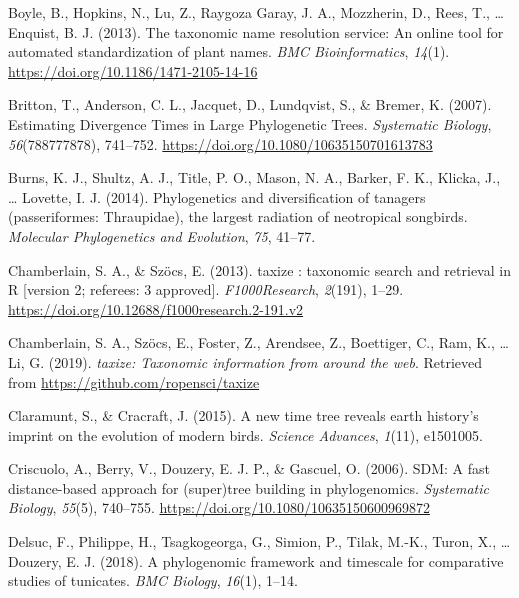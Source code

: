 \documentclass[
  english,
  man]{apa6}
\newlength{\cslhangindent}
\newlength{\cslentryspacingunit} %
\newenvironment{CSLReferences}[2] %
 {%
  \setlength{\parindent}{0pt}
  \ifodd #1
  \let\oldpar\par
  \def\par{\hangindent=\cslhangindent\oldpar}
  \fi
  \setlength{\parskip}{#2\cslentryspacingunit}
 }%
 {}
\begin{document}
\begin{CSLReferences}{1}{0}
\leavevmode{}%
Boyle, B., Hopkins, N., Lu, Z., Raygoza Garay, J. A., Mozzherin, D., Rees, T., \ldots{} Enquist, B. J. (2013). {The taxonomic name resolution service: An online tool for automated standardization of plant names}. \emph{{BMC Bioinformatics}}, \emph{14}(1). \url{https://doi.org/10.1186/1471-2105-14-16}

\leavevmode{}%
Britton, T., Anderson, C. L., Jacquet, D., Lundqvist, S., \& Bremer, K. (2007). {Estimating Divergence Times in Large Phylogenetic Trees}. \emph{{Systematic Biology}}, \emph{56}(788777878), 741--752. \url{https://doi.org/10.1080/10635150701613783}

\leavevmode{}%
Burns, K. J., Shultz, A. J., Title, P. O., Mason, N. A., Barker, F. K., Klicka, J., \ldots{} Lovette, I. J. (2014). Phylogenetics and diversification of tanagers (passeriformes: Thraupidae), the largest radiation of neotropical songbirds. \emph{{Molecular Phylogenetics and Evolution}}, \emph{75}, 41--77.

\leavevmode{}%
Chamberlain, S. A., \& Szöcs, E. (2013). {taxize : taxonomic search and retrieval in R {[}version 2; referees: 3 approved{]}}. \emph{{F1000Research}}, \emph{2}(191), 1--29. \url{https://doi.org/10.12688/f1000research.2-191.v2}

\leavevmode{}%
Chamberlain, S. A., Szöcs, E., Foster, Z., Arendsee, Z., Boettiger, C., Ram, K., \ldots{} Li, G. (2019). \emph{{taxize: Taxonomic information from around the web}}. Retrieved from \url{https://github.com/ropensci/taxize}

\leavevmode{}%
Claramunt, S., \& Cracraft, J. (2015). A new time tree reveals earth history's imprint on the evolution of modern birds. \emph{{Science Advances}}, \emph{1}(11), e1501005.

\leavevmode{}%
Criscuolo, A., Berry, V., Douzery, E. J. P., \& Gascuel, O. (2006). {SDM: A fast distance-based approach for (super)tree building in phylogenomics}. \emph{{Systematic Biology}}, \emph{55}(5), 740--755. \url{https://doi.org/10.1080/10635150600969872}

\leavevmode{}%
Delsuc, F., Philippe, H., Tsagkogeorga, G., Simion, P., Tilak, M.-K., Turon, X., \ldots{} Douzery, E. J. (2018). A phylogenomic framework and timescale for comparative studies of tunicates. \emph{BMC Biology}, \emph{16}(1), 1--14.


\end{CSLReferences}
\end{document}
